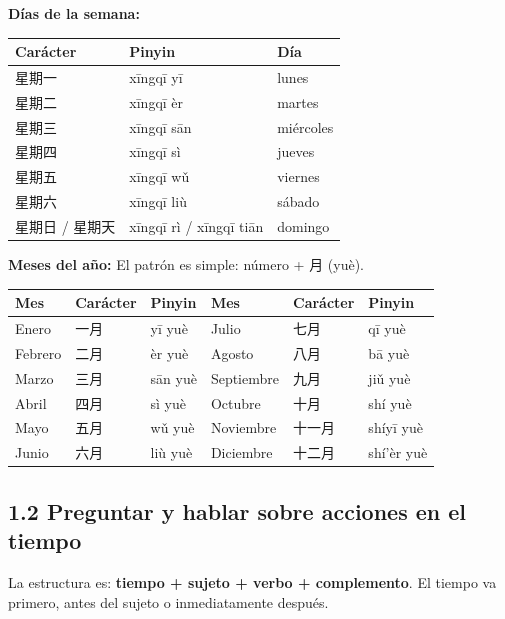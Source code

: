 \documentclass[12pt, a4paper]{article}
\begin{document}
\vspace{0.5em}
\noindent\textbf{Días de la semana:}

\begin{center}
\begin{tabular}{lll}
\toprule
\textbf{Carácter} & \textbf{Pinyin} & \textbf{Día} \\
\midrule
星期一 & xīngqī yī & lunes \\
星期二 & xīngqī èr & martes \\
星期三 & xīngqī sān & miércoles \\
星期四 & xīngqī sì & jueves \\
星期五 & xīngqī wǔ & viernes \\
星期六 & xīngqī liù & sábado \\
星期日 / 星期天 & xīngqī rì / xīngqī tiān & domingo \\
\bottomrule
\end{tabular}
\end{center}

\newpage

\noindent\textbf{Meses del año:} El patrón es simple: número + 月 (yuè).

\begin{center}
\begin{tabular}{lll|lll}
\toprule
\textbf{Mes} & \textbf{Carácter} & \textbf{Pinyin} & \textbf{Mes} & \textbf{Carácter} & \textbf{Pinyin} \\
\midrule
Enero    & 一月  & yī yuè    & Julio      & 七月  & qī yuè \\
Febrero  & 二月  & èr yuè    & Agosto     & 八月  & bā yuè \\
Marzo    & 三月  & sān yuè   & Septiembre & 九月  & jiǔ yuè \\
Abril    & 四月  & sì yuè    & Octubre    & 十月  & shí yuè \\
Mayo     & 五月  & wǔ yuè    & Noviembre  & 十一月 & shíyī yuè \\
Junio    & 六月  & liù yuè   & Diciembre  & 十二月 & shí'èr yuè \\
\bottomrule
\end{tabular}
\end{center}

\subsection{1.2 Preguntar y hablar sobre acciones en el tiempo}

La estructura es: \textbf{tiempo + sujeto + verbo + complemento}. El tiempo va primero, antes del sujeto o inmediatamente después.
\end{document}
